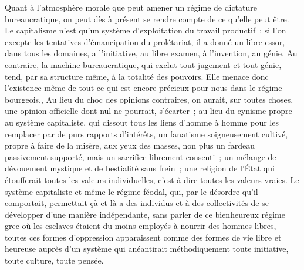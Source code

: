 \documentclass[french,twoside]{book} %
\begin{document}
Quant à l'atmosphère morale que peut amener un régime de dictature bureaucratique, on peut dès à présent se rendre compte de ce qu'elle peut être. Le capitalisme n'est qu'un système d'exploitation du travail productif ; si l'on excepte les tentatives d'émancipation du prolétariat, il a donné un libre essor, dans tous les domaines, a l'initiative, au libre examen, à l'invention, au génie. Au contraire, la machine bureaucratique, qui exclut tout jugement et tout génie, tend, par sa structure même, à la totalité des pouvoirs. Elle menace donc l'existence même de tout ce qui est encore précieux pour nous dans le régime bourgeois., Au lieu du choc des opinions contraires, on aurait, sur toutes choses, une opinion officielle dont nul ne pourrait, s'écarter ; au lieu du cynisme propre au système capitaliste, qui dissout tous les liens d'homme à homme pour les remplacer par de purs rapports d'intérêts, un fanatisme soigneusement cultivé, propre à faire de la misère, aux yeux des masses, non plus un fardeau passivement supporté, mais un sacrifice librement consenti ; un mélange de dévouement mystique et de bestialité sans frein ; une religion de l'État qui étoufferait toutes les valeurs individuelles, c'est-à-dire toutes les valeurs vraies. Le système capitaliste et même le régime féodal, qui, par le désordre qu'il comportait, permettait çà et là a des individus et à des collectivités de se développer d'une manière indépendante, sans parler de ce bienheureux régime grec où les esclaves étaient du moins employés à nourrir des hommes libres, toutes ces formes d'oppression apparaissent comme des formes de vie libre et heureuse auprès d'un système qui anéantirait méthodiquement toute initiative, toute culture, toute pensée.\par
\end{document}
